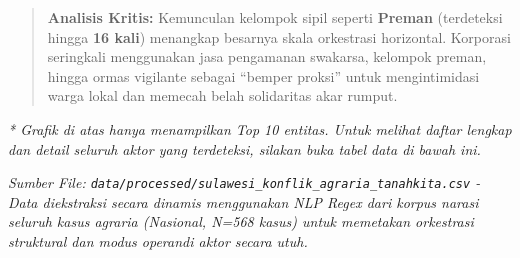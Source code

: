 \documentclass[
]{article}
\begin{document}
\begin{quote}
\textbf{Analisis Kritis:} Kemunculan kelompok sipil seperti
\textbf{Preman} (terdeteksi hingga \textbf{16 kali}) menangkap besarnya
skala orkestrasi horizontal. Korporasi seringkali menggunakan jasa
pengamanan swakarsa, kelompok preman, hingga ormas vigilante sebagai
``bemper proksi'' untuk mengintimidasi warga lokal dan memecah belah
solidaritas akar rumput.
\end{quote}

\emph{* Grafik di atas hanya menampilkan Top 10 entitas. Untuk melihat
daftar lengkap dan detail seluruh aktor yang terdeteksi, silakan buka
tabel data di bawah ini.}

\emph{Sumber File:
\texttt{data/processed/sulawesi\_konflik\_agraria\_tanahkita.csv} - Data
diekstraksi secara dinamis menggunakan NLP Regex dari korpus narasi
seluruh kasus agraria (Nasional, N=568 kasus) untuk memetakan orkestrasi
struktural dan modus operandi aktor secara utuh.}
\end{document}
